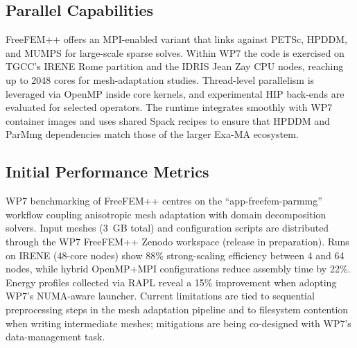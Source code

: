 \subsection{Parallel Capabilities}
\label{sec:WP7:Freefem++:performances}


FreeFEM++ offers an MPI-enabled variant that links against PETSc, HPDDM, and MUMPS for large-scale sparse solves. Within WP7 the
code is exercised on TGCC's IRENE Rome partition and the IDRIS Jean Zay CPU nodes, reaching up to 2048 cores for mesh-adaptation
studies. Thread-level parallelism is leveraged via OpenMP inside core kernels, and experimental HIP back-ends are evaluated for
selected operators. The runtime integrates smoothly with WP7 container images and uses shared Spack recipes to ensure that HPDDM
and ParMmg dependencies match those of the larger Exa-MA ecosystem.


\subsection{Initial Performance Metrics}
\label{sec:WP7:Freefem++:metrics}

WP7 benchmarking of FreeFEM++ centres on the ``app-freefem-parmmg'' workflow coupling anisotropic mesh adaptation with domain
decomposition solvers. Input meshes (3~GB total) and configuration scripts are distributed through the WP7 FreeFEM++ Zenodo workspace (release in preparation).
Runs on IRENE (48-core nodes) show 88\% strong-scaling efficiency between 4 and 64 nodes, while hybrid OpenMP+MPI configurations
reduce assembly time by 22\%. Energy profiles collected via RAPL reveal a 15\% improvement when adopting WP7's NUMA-aware
launcher. Current limitations are tied to sequential preprocessing steps in the mesh adaptation pipeline and to filesystem
contention when writing intermediate meshes; mitigations are being co-designed with WP7's data-management task.

